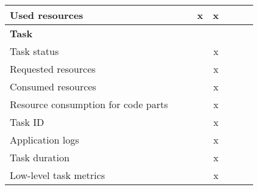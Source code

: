 \begin{table}[htbp]
{\begin{tabular}{lccccccc}
            Used resources                      &                   &                               & x                        & x                   &                         &                           &                           \\
            \midrule
            \multicolumn{8}{l}{\textbf{Task}}                                                                                                                                                                                          \\[3pt]
            Task status                         &                   &                               &                          & x                   &                         &                           &                           \\
            Requested resources                 &                   &                               &                          & x                   &                         &                           &                           \\
            Consumed resources                  &                   &                               &                          & x                   &                         &                           &                           \\
            Resource consumption for code parts &                   &                               &                          & x                   &                         &                           &                           \\
            Task ID                             &                   &                               &                          & x                   &                         &                           &                           \\
            Application logs                    &                   &                               &                          & x                   &                         &                           &                           \\
            Task duration                       &                   &                               &                          & x                   &                         &                           &                           \\
            Low-level task metrics              &                   &                               &                          & x                   &                         &                           &                           \\

\end{tabular}}
\end{table}

